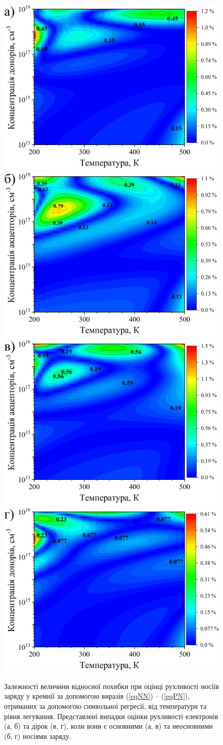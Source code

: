\documentclass[12pt,a4paper,titlepage,oneside]{book}
\numberwithin{equation}{part}
\begin{document}
\begin{figure}
	\centering
     \includegraphics[width=0.49\linewidth]{Fig31a.png}
     \includegraphics[width=0.49\linewidth]{Fig31b.png}
     \includegraphics[width=0.49\linewidth]{Fig31c.png}
     \includegraphics[width=0.49\linewidth]{Fig31d.png}
	  \caption{Залежності величини відносної похибки при оцінці рухливості носіїв заряду
у кремнії за допомогою виразів (\ref{eqNN}) -- (\ref{eqPN}),
отриманих за допомогою символьної регресії, від температури та рівня легування.
Представлені випадки оцінки рухливості електронів (а, б) та дірок (в, г), коли вони є
основними (а, в) та неосновними (б, г) носіями заряду.
}\label{figSR}
\end{figure}
\end{document}

